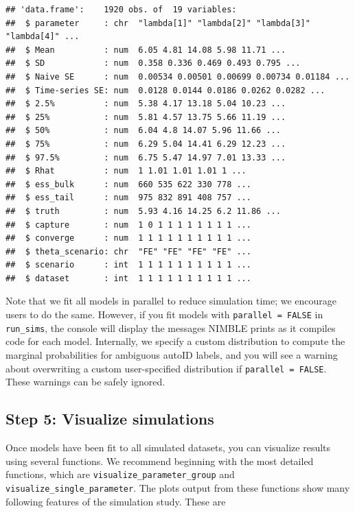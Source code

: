 \documentclass[
]{article}
\begin{document}
\begin{verbatim}
## 'data.frame':    1920 obs. of  19 variables:
##  $ parameter     : chr  "lambda[1]" "lambda[2]" "lambda[3]" "lambda[4]" ...
##  $ Mean          : num  6.05 4.81 14.08 5.98 11.71 ...
##  $ SD            : num  0.358 0.336 0.469 0.493 0.795 ...
##  $ Naive SE      : num  0.00534 0.00501 0.00699 0.00734 0.01184 ...
##  $ Time-series SE: num  0.0128 0.0144 0.0186 0.0262 0.0282 ...
##  $ 2.5%          : num  5.38 4.17 13.18 5.04 10.23 ...
##  $ 25%           : num  5.81 4.57 13.75 5.66 11.19 ...
##  $ 50%           : num  6.04 4.8 14.07 5.96 11.66 ...
##  $ 75%           : num  6.29 5.04 14.41 6.29 12.23 ...
##  $ 97.5%         : num  6.75 5.47 14.97 7.01 13.33 ...
##  $ Rhat          : num  1 1.01 1.01 1.01 1 ...
##  $ ess_bulk      : num  660 535 622 330 778 ...
##  $ ess_tail      : num  975 832 891 408 757 ...
##  $ truth         : num  5.93 4.16 14.25 6.2 11.86 ...
##  $ capture       : num  1 0 1 1 1 1 1 1 1 1 ...
##  $ converge      : num  1 1 1 1 1 1 1 1 1 1 ...
##  $ theta_scenario: chr  "FE" "FE" "FE" "FE" ...
##  $ scenario      : int  1 1 1 1 1 1 1 1 1 1 ...
##  $ dataset       : int  1 1 1 1 1 1 1 1 1 1 ...
\end{verbatim}

\linespread{1}

Note that we fit all models in parallel to reduce simulation time; we encourage users to do the same. However, if you fit models with \texttt{parallel\ =\ FALSE} in \texttt{run\_sims}, the console will display the messages NIMBLE prints as it compiles code for each model. Internally, we specify a custom distribution to compute the marginal probabilities for ambiguous autoID labels, and you will see a warning about overwriting a custom user-specified distribution if \texttt{parallel\ =\ FALSE}. These warnings can be safely ignored.

\subsection{\texorpdfstring{Step 5: Visualize simulations \label{viz}}{Step 5: Visualize simulations }}\label{step-5-visualize-simulations}

Once models have been fit to all simulated datasets, you can visualize results using several functions. We recommend beginning with the most detailed functions, which are \texttt{visualize\_parameter\_group} and \texttt{visualize\_single\_parameter}. The plots output from these functions show many following features of the simulation study. These are
\end{document}
